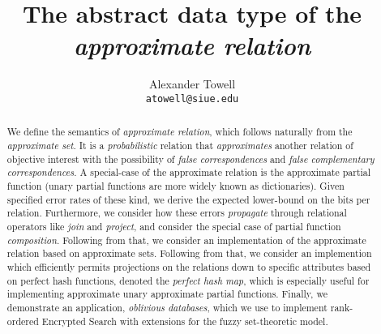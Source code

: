 \documentclass[11pt,final,hidelinks]{article}
\title
{
    The abstract data type of the \emph{approximate relation}
}
\author
{
    Alexander Towell\\
    \texttt{atowell@siue.edu}
}
\date{}
\begin{document}
\maketitle
\begin{abstract}
We define the semantics of \emph{approximate relation}, which follows naturally from the \emph{approximate set}. It is a \emph{probabilistic} relation that \emph{approximates} another relation of objective interest with the possibility of \emph{false correspondences} and \emph{false complementary correspondences}. A special-case of the approximate relation is the approximate partial function (unary partial functions are more widely known as dictionaries). Given specified error rates of these kind, we derive the expected lower-bound on the bits per relation. Furthermore, we consider how these errors \emph{propagate} through relational operators like \emph{join} and \emph{project}, and consider the special case of partial function \emph{composition}. Following from that, we consider an implementation of the approximate relation based on approximate sets. Following from that, we consider an implemention which efficiently permits projections on the relations down to specific attributes based on perfect hash functions, denoted the \emph{perfect hash map}, which is especially useful for implementing approximate unary approximate partial functions. Finally, we demonstrate an application, \emph{oblivious databases}, which we use to implement rank-ordered Encrypted Search with extensions for the fuzzy set-theoretic model.
\end{abstract}


\tableofcontents
{}


\newcommand{\ExactMap}[1]{M(#1)}













%
\printglossary

\end{document}
